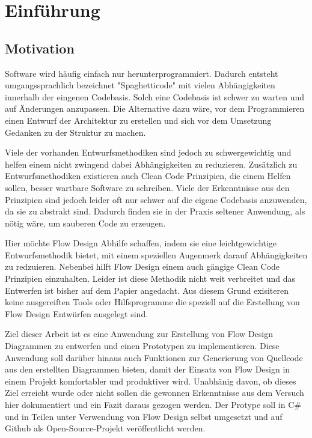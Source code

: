 
\section{Einführung}

\subsection{Motivation}

Software wird häufig einfach nur herunterprogrammiert. Dadurch entsteht
umgangssprachlich bezeichnet "Spaghetticode" mit vielen Abhängigkeiten innerhalb
der eingenen Codebasis. Solch eine Codebasis ist schwer zu warten und auf
Änderungen anzupassen. Die Alternative dazu wäre, vor dem Programmieren einen
Entwurf der Architektur zu erstellen und sich vor dem Umsetzung Gedanken zu
der Struktur zu machen.

Viele der vorhanden Entwurfsmethodiken sind jedoch zu schwergewichtig und helfen
einem nicht zwingend dabei Abhängigkeiten zu reduzieren.
Zusätzlich zu Entwurfsmethodiken existieren auch Clean Code Prinzipien, die
einem Helfen sollen, besser wartbare Software zu schreiben. Viele der
Erkenntnisse aus den Prinzipien sind jedoch leider oft nur schwer auf die eigene
Codebasis anzuwenden, da sie zu abstrakt sind.
Dadurch finden sie in der Praxis seltener Anwendung, als nötig wäre, um sauberen
Code zu erzeugen.

Hier möchte Flow Design Abhilfe schaffen, indem sie eine leichtgewichtige
Entwurfsmethodik bietet, mit einem speziellen Augenmerk darauf Abhängigkeiten
zu redzuieren. Nebenbei hilft Flow Design einem auch gängige Clean Code
Prinzipien einzuhalten. Leider ist diese Methodik nicht weit verbreitet und das
Entwerfen ist bisher auf dem Papier angedacht. Aus diesem Grund exisiteren keine
ausgereiften Tools oder Hilfsprogramme die speziell auf die Erstellung
von Flow Design Entwürfen ausgelegt sind. 

Ziel dieser Arbeit ist es eine Anwendung zur Erstellung von Flow Design Diagrammen 
zu entwerfen und einen Prototypen zu implementieren. Diese Anwendung soll darüber hinaus auch
Funktionen zur Generierung von Quellcode aus den erstellten Diagrammen bieten, damit
der Einsatz von Flow Design in einem Projekt komfortabler und produktiver wird.
Unabhänig davon, ob dieses Ziel erreicht wurde oder nicht sollen die gewonnen
Erkenntnisse aus dem Versuch hier dokumentiert und ein Fazit daraus gezogen werden.
Der Protype soll in C\# und in Teilen unter Verwendung von Flow Design selbst umgesetzt und auf Github
als Open-Source-Projekt veröffentlicht werden.


